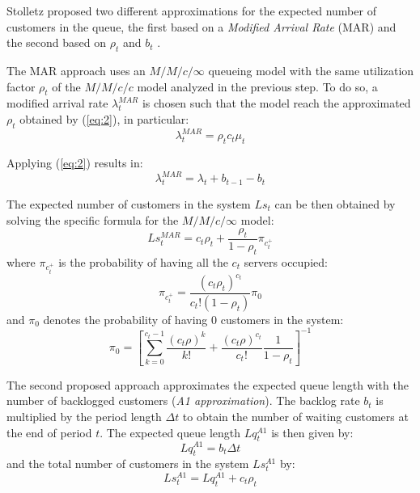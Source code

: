 Stolletz proposed two different approximations for the expected number of customers in the queue, the first based on a \emph{Modified Arrival Rate} (MAR) and the second based on \( \rho_t \) and \( b_t \) \cite{stolletz}.

The MAR approach uses an \( M/M/c/\infty \) queueing model with the same utilization factor \( \rho_t \) of the \( M/M/c/c \) model analyzed in the previous step. To do so, a modified arrival rate \( \lambda_t^{MAR} \) is chosen such that the model reach the approximated \( \rho_t \) obtained by (\ref{eq:2}), in particular:
\begin{equation}
  \lambda_t^{MAR} = \rho_t c_t \mu_t
\end{equation}

Applying (\ref{eq:2}) results in:
\begin{equation}
  \lambda_t^{MAR} = \lambda_t + b_{t-1} - b_t
\end{equation}

The expected number of customers in the system \( Ls_t \) can be then obtained by solving the specific formula for the \( M/M/c/\infty \) model:
\begin{equation}
  Ls_t^{MAR} = c_t\rho_t + \frac{\rho_t}{1-\rho_t} \pi_{c_t^+}
\end{equation}
where \( \pi_{c_t^+} \) is the probability of having all the \( c_t \) servers occupied:
\begin{equation}
  \pi_{c_t^+} = \frac{(c_t\rho_t)^{c_t}}{c_t!(1-\rho_t)}\pi_0
\end{equation}
and \( \pi_0 \) denotes the probability of having \( 0 \) customers in the system:
\begin{equation}
  \pi_0 = \left[ \sum_{k=0}^{c_t-1} \frac{(c_t\rho)^k}{k!} + \frac{(c_t\rho)^{c_t}}{c_t!} \frac{1}{1-\rho_t} \right]^{-1}
\end{equation}

The second proposed approach approximates the expected queue length with the number of backlogged customers (\emph{A1 approximation}). The backlog rate \( b_t \) is multiplied by the period length \( \Delta t \) to obtain the number of waiting customers at the end of period \( t \). The expected queue length \( Lq_t^{A1} \) is then given by:
\begin{equation}
  Lq_t^{A1} = b_t \Delta t
\end{equation}
and the total number of customers in the system \( Ls_t^{A1} \) by:
\begin{equation}
  Ls_t^{A1} = Lq_t^{A1} + c_t \rho_t
\end{equation}

